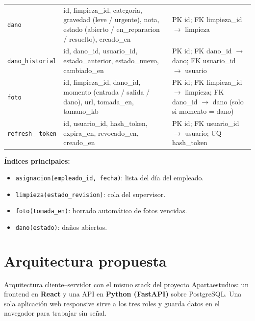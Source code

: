 \documentclass[11pt,a4paper]{article}
\begin{document}
{\begin{longtable}{L{2.9cm} L{6.6cm} L{5.4cm}}
\texttt{dano} & id, limpieza\_id, categoria, gravedad (leve / urgente), nota, estado (abierto / en\_reparacion / resuelto), creado\_en & PK id; FK limpieza\_id $\rightarrow$ limpieza\\
\texttt{dano\_historial} & id, dano\_id, usuario\_id, estado\_anterior, estado\_nuevo, cambiado\_en & PK id; FK dano\_id $\rightarrow$ dano; FK usuario\_id $\rightarrow$ usuario\\
\texttt{foto} & id, limpieza\_id, dano\_id, momento (entrada / salida / dano), url, tomada\_en, tamano\_kb & PK id; FK limpieza\_id $\rightarrow$ limpieza; FK dano\_id $\rightarrow$ dano (solo si momento = dano)\\
\texttt{refresh\_ token} & id, usuario\_id, hash\_token, expira\_en, revocado\_en, creado\_en & PK id; FK usuario\_id $\rightarrow$ usuario; UQ hash\_token\\
\end{longtable}
}

\textbf{Índices principales:}
\begin{itemize}[leftmargin=1.2em]
  \item \texttt{asignacion(empleado\_id, fecha)}: lista del día del empleado.
  \item \texttt{limpieza(estado\_revision)}: cola del supervisor.
  \item \texttt{foto(tomada\_en)}: borrado automático de fotos vencidas.
  \item \texttt{dano(estado)}: daños abiertos.
\end{itemize}

\section{Arquitectura propuesta}

Arquitectura cliente--servidor con el mismo stack del proyecto Apartaestudios: un frontend en \textbf{React} y una API en \textbf{Python (FastAPI)} sobre PostgreSQL. Una sola aplicación web responsive sirve a los tres roles y guarda datos en el navegador para trabajar sin señal.
\end{document}
